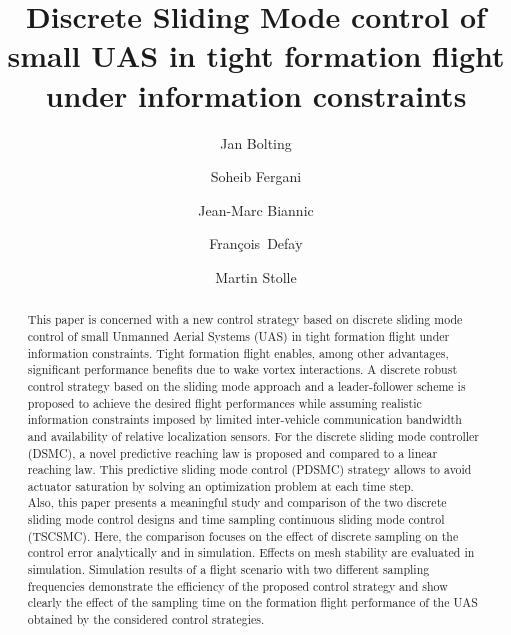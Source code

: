 \documentclass{ifacconf}
\newcommand{\Francois}{\mbox{Fran\c{c}ois Defa$\ddot{\textrm{y}}$}}
\begin{document}
\begin{frontmatter}

\title{Discrete Sliding Mode control of small UAS in tight formation flight under information constraints}

\author[First]{Jan Bolting}
\author[First]{Soheib Fergani}
\author[Second]{Jean-Marc Biannic}
\author[First]{\Francois}
\author[Second]{Martin Stolle}

\address[First]{Institut Supérieur de l'Aéronautique et de l'Espace (ISAE),
   31055 Toulouse, France (e-mail: jan.bolting@isae.fr, soheib.fergani@isae.fr, francois.defay@isae.fr)}
\address[Second]{Office National d'Études et de Recherches Aérospatiales (ONERA),
   31055 Toulouse, France (e-mail: jean-marc.biannic@onera.fr, martin.stolle@onera.fr)}
   

\begin{abstract}
This paper is concerned with a new control strategy  based on discrete sliding mode control of small Unmanned Aerial Systems (UAS) in tight formation flight under information constraints. 
Tight formation flight enables, among other advantages, significant performance benefits due to wake vortex interactions. 
A discrete robust control strategy based on the sliding mode approach and a leader-follower scheme is proposed to achieve the desired flight performances while assuming realistic information constraints imposed by limited inter-vehicle communication bandwidth and availability of relative localization sensors.
For the discrete sliding mode controller (DSMC), a novel predictive reaching law is proposed and compared to a linear reaching law. This predictive sliding mode control (PDSMC) strategy allows to avoid actuator saturation by solving an optimization problem at each time step.\\
Also, this paper presents a meaningful study and comparison of the two discrete sliding mode control designs and  time sampling continuous sliding mode control (TSCSMC). 
Here, the comparison focuses on the effect of discrete sampling on the control error analytically and in simulation. Effects on mesh stability are evaluated in simulation.
Simulation results of a flight scenario with two different sampling frequencies demonstrate the efficiency of the proposed control strategy and show clearly the effect of the sampling time on the formation flight performance of the UAS obtained by the considered control strategies.


\end{abstract}
\end{frontmatter}
\end{document}
